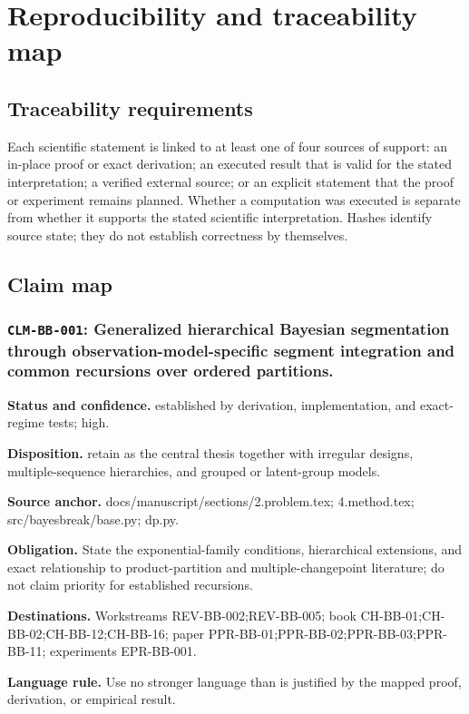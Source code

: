 
\chapter{Reproducibility and traceability map}
\label{app:traceability}

\section{Traceability requirements}
Each scientific statement is linked to at least one of four sources of support: an in-place proof or exact derivation; an executed result that is valid for the stated interpretation; a verified external source; or an explicit statement that the proof or experiment remains planned. Whether a computation was executed is separate from whether it supports the stated scientific interpretation. Hashes identify source state; they do not establish correctness by themselves.

\section{Claim map}
\subsection[\texttt{CLM-BB-001}]{\texttt{CLM-BB-001}: Generalized hierarchical Bayesian segmentation through observation-model-specific segment integration and common recursions over ordered partitions.}
\textbf{Status and confidence.} established by derivation, implementation, and exact-regime tests; high.\par
\textbf{Disposition.} retain as the central thesis together with irregular designs, multiple-sequence hierarchies, and grouped or latent-group models.\par
\textbf{Source anchor.} docs/manuscript/sections/2.problem.tex; 4.method.tex; src/bayesbreak/base.py; dp.py.\par
\textbf{Obligation.} State the exponential-family conditions, hierarchical extensions, and exact relationship to product-partition and multiple-changepoint literature; do not claim priority for established recursions.\par
\textbf{Destinations.} Workstreams REV-BB-002;REV-BB-005; book CH-BB-01;CH-BB-02;CH-BB-12;CH-BB-16; paper PPR-BB-01;PPR-BB-02;PPR-BB-03;PPR-BB-11; experiments EPR-BB-001.\par
\textbf{Language rule.} Use no stronger language than is justified by the mapped proof, derivation, or empirical result.

